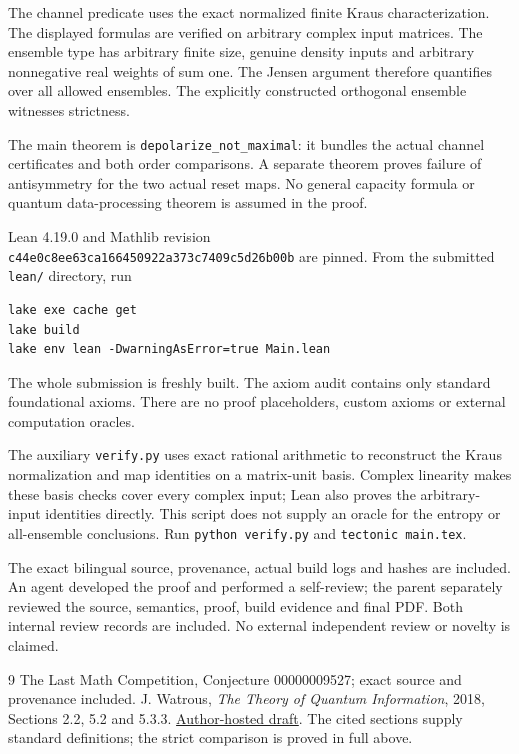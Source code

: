 \documentclass[11pt]{article}
\begin{document}
The channel predicate uses the exact normalized finite
Kraus characterization. The displayed formulas are verified
on arbitrary complex input matrices. The ensemble type
has arbitrary finite size, genuine density inputs and
arbitrary nonnegative real weights of sum one. The Jensen
argument therefore quantifies over all allowed ensembles.
The explicitly constructed orthogonal ensemble witnesses
strictness.

The main theorem is \texttt{depolarize\_not\_maximal}:
it bundles the actual channel certificates and both order
comparisons. A separate theorem proves failure of
antisymmetry for the two actual reset maps. No general
capacity formula or quantum data-processing theorem is
assumed in the proof.

Lean 4.19.0 and Mathlib revision\\
\texttt{c44e0c8ee63ca166450922a373c7409c5d26b00b}
are pinned. From the submitted \texttt{lean/} directory, run
\begin{verbatim}
lake exe cache get
lake build
lake env lean -DwarningAsError=true Main.lean
\end{verbatim}
The whole submission is freshly built. The axiom audit
contains only standard foundational axioms. There are no
proof placeholders, custom axioms or external computation
oracles.

The auxiliary \texttt{verify.py} uses exact rational
arithmetic to reconstruct the Kraus normalization and map
identities on a matrix-unit basis. Complex linearity makes
these basis checks cover every complex input; Lean also
proves the arbitrary-input identities directly. This
script does not supply an oracle for the entropy or
all-ensemble conclusions. Run \texttt{python verify.py}
and \texttt{tectonic main.tex}.

The exact bilingual source, provenance, actual build logs
and hashes are included. An agent developed the proof and
performed a self-review; the parent separately reviewed
the source, semantics, proof, build evidence and final PDF.
Both internal review records are included. No external
independent review or novelty is claimed.

\begin{thebibliography}{9}
 The Last Math Competition,
Conjecture 00000009527; exact source and provenance included.
 J. Watrous, \emph{The Theory of Quantum
Information}, 2018, Sections 2.2, 5.2 and 5.3.3.
\href{https://cs.uwaterloo.ca/~watrous/TQI/TQI.pdf}{Author-hosted draft}.
The cited sections supply standard definitions; the strict
comparison is proved in full above.
\end{thebibliography}
\end{document}
